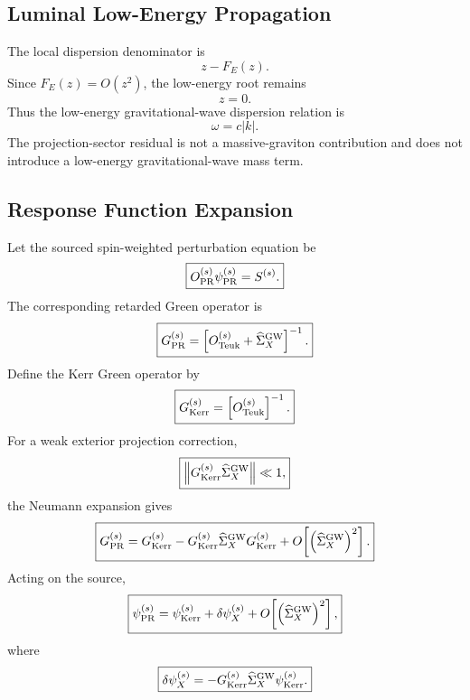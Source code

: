 \documentclass[11pt]{article}
\begin{document}
\subsection{Luminal Low-Energy Propagation}

The local dispersion denominator is
\begin{equation}
\boxed{
z-F_E(z).
}
\end{equation}
Since \(F_E(z)=O(z^2)\), the low-energy root remains
\begin{equation}
\boxed{
z=0.
}
\end{equation}
Thus the low-energy gravitational-wave dispersion relation is
\begin{equation}
\boxed{
\omega=c|k|.
}
\end{equation}
The projection-sector residual is not a massive-graviton contribution and does not introduce a low-energy gravitational-wave mass term.

\subsection{Response Function Expansion}

Let the sourced spin-weighted perturbation equation be
\begin{equation}
\boxed{
O_{\rm PR}^{(s)}\psi_{\rm PR}^{(s)}
=
S^{(s)}.
}
\end{equation}
The corresponding retarded Green operator is
\begin{equation}
\boxed{
G_{\rm PR}^{(s)}
=
\left[
O_{\rm Teuk}^{(s)}
+
\widehat{\Sigma}_{X}^{\rm GW}
\right]^{-1}.
}
\end{equation}
Define the Kerr Green operator by
\begin{equation}
\boxed{
G_{\rm Kerr}^{(s)}
=
\left[
O_{\rm Teuk}^{(s)}
\right]^{-1}.
}
\end{equation}
For a weak exterior projection correction,
\begin{equation}
\boxed{
\left\|
G_{\rm Kerr}^{(s)}
\widehat{\Sigma}_{X}^{\rm GW}
\right\|
\ll1,
}
\end{equation}
the Neumann expansion gives
\begin{equation}
\boxed{
G_{\rm PR}^{(s)}
=
G_{\rm Kerr}^{(s)}
-
G_{\rm Kerr}^{(s)}
\widehat{\Sigma}_{X}^{\rm GW}
G_{\rm Kerr}^{(s)}
+
O\!\left[
\left(
\widehat{\Sigma}_{X}^{\rm GW}
\right)^2
\right].
}
\end{equation}
Acting on the source,
\begin{equation}
\boxed{
\psi_{\rm PR}^{(s)}
=
\psi_{\rm Kerr}^{(s)}
+
\delta\psi_X^{(s)}
+
O\!\left[
\left(
\widehat{\Sigma}_{X}^{\rm GW}
\right)^2
\right],
}
\end{equation}
where
\begin{equation}
\boxed{
\delta\psi_X^{(s)}
=
-
G_{\rm Kerr}^{(s)}
\widehat{\Sigma}_{X}^{\rm GW}
\psi_{\rm Kerr}^{(s)}.
}
\end{equation}
\end{document}
